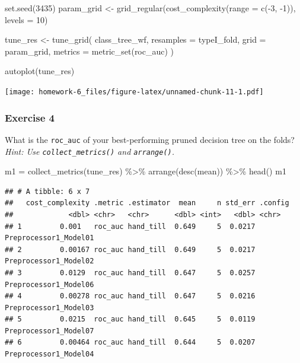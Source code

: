 \documentclass[
]{article}
\newenvironment{Shaded}{\begin{snugshade}}{\end{snugshade}}
\newcommand{\AttributeTok}[1]{\textcolor[rgb]{0.77,0.63,0.00}{#1}}
\newcommand{\DecValTok}[1]{\textcolor[rgb]{0.00,0.00,0.81}{#1}}
\newcommand{\FunctionTok}[1]{\textcolor[rgb]{0.00,0.00,0.00}{#1}}
\newcommand{\NormalTok}[1]{#1}
\newcommand{\OtherTok}[1]{\textcolor[rgb]{0.56,0.35,0.01}{#1}}
\newcommand{\SpecialCharTok}[1]{\textcolor[rgb]{0.00,0.00,0.00}{#1}}
\begin{document}
\begin{Shaded}
\begin{Highlighting}[]
\FunctionTok{set.seed}\NormalTok{(}\DecValTok{3435}\NormalTok{)}
\NormalTok{param\_grid }\OtherTok{\textless{}{-}} \FunctionTok{grid\_regular}\NormalTok{(}\FunctionTok{cost\_complexity}\NormalTok{(}\AttributeTok{range =} \FunctionTok{c}\NormalTok{(}\SpecialCharTok{{-}}\DecValTok{3}\NormalTok{, }\SpecialCharTok{{-}}\DecValTok{1}\NormalTok{)), }\AttributeTok{levels =} \DecValTok{10}\NormalTok{)}

\NormalTok{tune\_res }\OtherTok{\textless{}{-}} \FunctionTok{tune\_grid}\NormalTok{(}
\NormalTok{  class\_tree\_wf, }
  \AttributeTok{resamples =}\NormalTok{ typeI\_fold, }
  \AttributeTok{grid =}\NormalTok{ param\_grid, }
  \AttributeTok{metrics =} \FunctionTok{metric\_set}\NormalTok{(roc\_auc)}
\NormalTok{)}
\end{Highlighting}
\end{Shaded}

\begin{Shaded}
\begin{Highlighting}[]
\FunctionTok{autoplot}\NormalTok{(tune\_res)}
\end{Highlighting}
\end{Shaded}

\texttt{[image: homework-6\_files/figure-latex/unnamed-chunk-11-1.pdf]}

\hypertarget{exercise-4}{%
\subsubsection{Exercise 4}\label{exercise-4}}

What is the \texttt{roc\_auc} of your best-performing pruned decision
tree on the folds? \emph{Hint: Use \texttt{collect\_metrics()} and
\texttt{arrange()}.}

\begin{Shaded}
\begin{Highlighting}[]
\NormalTok{m1 }\OtherTok{=} \FunctionTok{collect\_metrics}\NormalTok{(tune\_res) }\SpecialCharTok{\%\textgreater{}\%} \FunctionTok{arrange}\NormalTok{(}\FunctionTok{desc}\NormalTok{(mean)) }\SpecialCharTok{\%\textgreater{}\%} \FunctionTok{head}\NormalTok{()}
\NormalTok{m1}
\end{Highlighting}
\end{Shaded}

\begin{verbatim}
## # A tibble: 6 x 7
##   cost_complexity .metric .estimator  mean     n std_err .config              
##             <dbl> <chr>   <chr>      <dbl> <int>   <dbl> <chr>                
## 1         0.001   roc_auc hand_till  0.649     5  0.0217 Preprocessor1_Model01
## 2         0.00167 roc_auc hand_till  0.649     5  0.0217 Preprocessor1_Model02
## 3         0.0129  roc_auc hand_till  0.647     5  0.0257 Preprocessor1_Model06
## 4         0.00278 roc_auc hand_till  0.647     5  0.0216 Preprocessor1_Model03
## 5         0.0215  roc_auc hand_till  0.645     5  0.0119 Preprocessor1_Model07
## 6         0.00464 roc_auc hand_till  0.644     5  0.0207 Preprocessor1_Model04
\end{verbatim}
\end{document}
